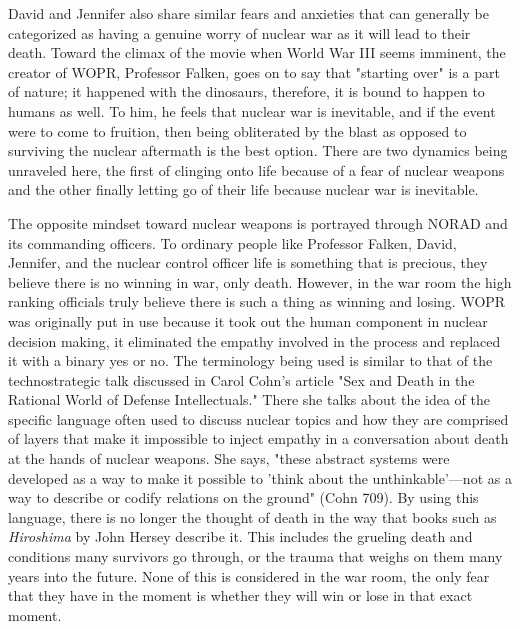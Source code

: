 \documentclass[12pt]{turabian-researchpaper}
\begin{document}
David and Jennifer also share similar fears and anxieties that can generally be categorized as having a genuine worry of nuclear war as it will lead to their death. Toward the climax of the movie when World War III seems imminent, the creator of WOPR, Professor Falken, goes on to say that "starting over" is a part of nature; it happened with the dinosaurs, therefore, it is bound to happen to humans as well. To him, he feels that nuclear war is inevitable, and if the event were to come to fruition, then being obliterated by the blast as opposed to surviving the nuclear aftermath is the best option. There are two dynamics being unraveled here, the first of clinging onto life because of a fear of nuclear weapons and the other finally letting go of their life because nuclear war is inevitable. 

The opposite mindset toward nuclear weapons is portrayed through NORAD and its commanding officers. To ordinary people like Professor Falken, David, Jennifer, and the nuclear control officer life is something that is precious, they believe there is no winning in war, only death. However, in the war room the high ranking officials truly believe there is such a thing as winning and losing. WOPR was originally put in use because it took out the human component in nuclear decision making, it eliminated the empathy involved in the process and replaced it with a binary yes or no. The terminology being used is similar to that of the technostrategic talk discussed in Carol Cohn's article "Sex and Death in the Rational World of Defense Intellectuals." There she talks about the idea of the specific language often used to discuss nuclear topics and how they are comprised of layers that make it impossible to inject empathy in a conversation about death at the hands of nuclear weapons. She says, "these abstract systems were developed as a way to make it possible to 'think about the unthinkable'—not as a way to describe or codify relations on the ground" (Cohn 709). By using this language, there is no longer the thought of death in the way that books such as \textit{Hiroshima} by John Hersey describe it. This includes the grueling death and conditions many survivors go through, or the trauma that weighs on them many years into the future. None of this is considered in the war room, the only fear that they have in the moment is whether they will win or lose in that exact moment. 
\end{document}
